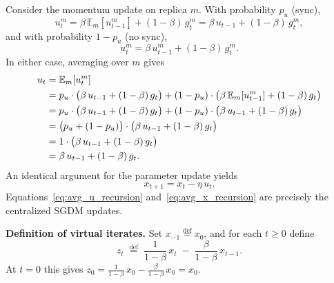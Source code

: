 \documentclass{article}
\begin{document}
Consider the momentum update on replica $m$. With probability $p_u$ (sync),
\[
u_t^m = \beta\,\mathbb{E}_m[u_{t-1}^m] + (1-\beta)\,g_t^m
       = \beta\,u_{t-1} + (1-\beta)\,g_t^m,
\]
and with probability $1-p_u$ (no sync),
\[
u_t^m = \beta\,u_{t-1}^m + (1-\beta)\,g_t^m.
\]
In either case, averaging over $m$ gives
\begin{align}
u_t &= \mathbb{E}_m[u_t^m] \notag \\
    &= p_u \cdot \bigl(\beta\,u_{t-1} + (1-\beta)\,g_t\bigr)
       + (1-p_u) \cdot \bigl(\beta\,\mathbb{E}_m[u_{t-1}^m]
       + (1-\beta)\,g_t\bigr) \notag \\
    &= p_u \cdot \bigl(\beta\,u_{t-1} + (1-\beta)\,g_t\bigr)
       + (1-p_u) \cdot \bigl(\beta\,u_{t-1}
       + (1-\beta)\,g_t\bigr) \notag \\
    &= \bigl(p_u + (1-p_u)\bigr) \cdot
       \bigl(\beta\,u_{t-1} + (1-\beta)\,g_t\bigr) \notag \\
    &= 1 \cdot \bigl(\beta\,u_{t-1} + (1-\beta)\,g_t\bigr) \notag \\
    &= \beta\,u_{t-1} + (1-\beta)\,g_t. \label{eq:avg_u_recursion}
\end{align}
An identical argument for the parameter update yields
\begin{equation}
x_{t+1} = x_t - \eta\,u_t. \label{eq:avg_x_recursion}
\end{equation}
Equations~\eqref{eq:avg_u_recursion} and~\eqref{eq:avg_x_recursion} are
precisely the centralized SGDM updates.

\medskip
\noindent\textbf{Definition of virtual iterates.}
Set $x_{-1} \stackrel{\text{def}}{=} x_0$, and for each $t \geq 0$ define
\begin{equation}
z_t \;\stackrel{\text{def}}{=}\;
\frac{1}{1-\beta}\,x_t \;-\; \frac{\beta}{1-\beta}\,x_{t-1}.
\label{eq:virtual}
\end{equation}
At $t = 0$ this gives $z_0 = \frac{1}{1-\beta}\,x_0 - \frac{\beta}{1-\beta}\,x_0 = x_0$.
\end{document}
